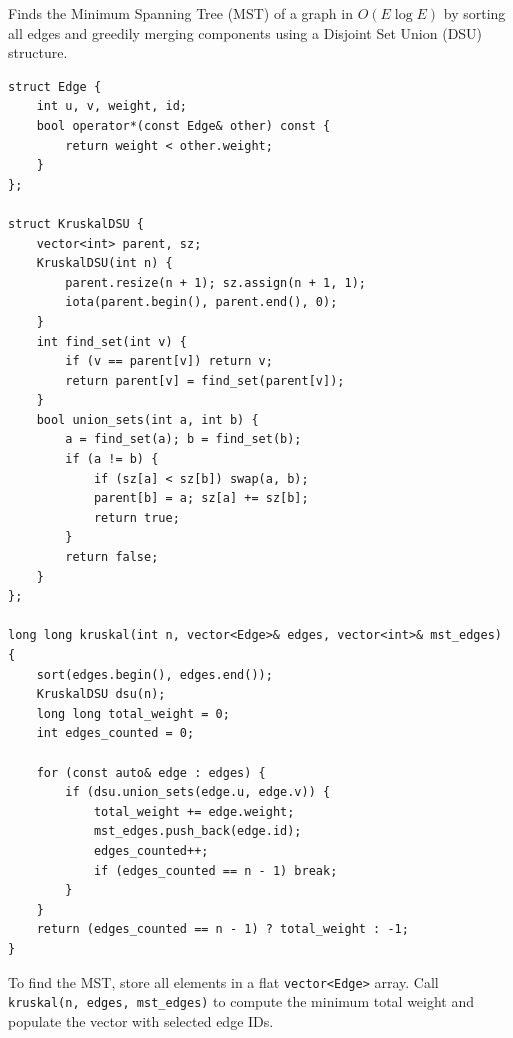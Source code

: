 
Finds the Minimum Spanning Tree (MST) of a graph in $O(E \log E)$ by sorting all edges and greedily merging components using a Disjoint Set Union (DSU) structure.

\begin{lstlisting}
struct Edge {
    int u, v, weight, id;
    bool operator*(const Edge& other) const {
        return weight < other.weight;
    }
};

struct KruskalDSU {
    vector<int> parent, sz;
    KruskalDSU(int n) {
        parent.resize(n + 1); sz.assign(n + 1, 1);
        iota(parent.begin(), parent.end(), 0);
    }
    int find_set(int v) {
        if (v == parent[v]) return v;
        return parent[v] = find_set(parent[v]);
    }
    bool union_sets(int a, int b) {
        a = find_set(a); b = find_set(b);
        if (a != b) {
            if (sz[a] < sz[b]) swap(a, b);
            parent[b] = a; sz[a] += sz[b];
            return true;
        }
        return false;
    }
};

long long kruskal(int n, vector<Edge>& edges, vector<int>& mst_edges) {
    sort(edges.begin(), edges.end());
    KruskalDSU dsu(n);
    long long total_weight = 0;
    int edges_counted = 0;

    for (const auto& edge : edges) {
        if (dsu.union_sets(edge.u, edge.v)) {
            total_weight += edge.weight;
            mst_edges.push_back(edge.id);
            edges_counted++;
            if (edges_counted == n - 1) break;
        }
    }
    return (edges_counted == n - 1) ? total_weight : -1;
}
\end{lstlisting}

To find the MST, store all elements in a flat \lstinline|vector<Edge>| array. Call \lstinline|kruskal(n, edges, mst_edges)| to compute the minimum total weight and populate the vector with selected edge IDs.
